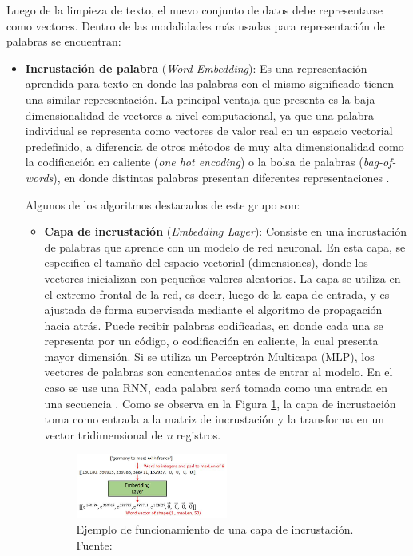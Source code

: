 Luego de la limpieza de texto, el nuevo conjunto de datos debe representarse como vectores. Dentro de las modalidades más usadas para representación de palabras se encuentran:
\begin{itemize}
	\item \textbf{Incrustación de palabra} (\textit{Word Embedding}): Es una representación aprendida para texto en donde las palabras con el mismo significado tienen una similar representación. La principal ventaja que presenta es la baja dimensionalidad de vectores a nivel computacional, ya que una palabra individual se representa como vectores de valor real en un espacio vectorial predefinido, a diferencia de otros métodos de muy alta dimensionalidad como la codificación en caliente (\textit{one hot encoding}) o la bolsa de palabras (\textit{bag-of-words}), en donde distintas palabras presentan diferentes representaciones \parencite{bk_brownlee2017deeplearning_nlp}.
	
	Algunos de los algoritmos destacados de este grupo son:
	\begin{itemize}
		\item \textbf{Capa de incrustación} (\textit{Embedding Layer}): Consiste en una incrustación de palabras que aprende con un modelo de red neuronal. En esta capa, se especifica el tamaño del espacio vectorial (dimensiones), donde los vectores inicializan con pequeños valores aleatorios. La capa se utiliza en el extremo frontal de la red, es decir, luego de la capa de entrada, y es ajustada de forma supervisada mediante el algoritmo de propagación hacia atrás. Puede recibir palabras codificadas, en donde cada una se representa por un código, o codificación en caliente, la cual presenta mayor dimensión. Si se utiliza un Perceptrón Multicapa (MLP), los vectores de palabras son concatenados antes de entrar al modelo. En el caso se use una RNN, cada palabra será tomada como una entrada en una secuencia \parencite{bk_brownlee2017deeplearning_nlp}. Como se observa en la Figura \ref{2:fig47}, la capa de incrustación toma como entrada a la matriz de incrustación y la transforma en un vector tridimensional de \textit{n} registros.
		
		\begin{figure}[!ht]
			\begin{center}
				\includegraphics[width=0.50\textwidth]{2/figures/embedding_layer.jpg}
				\caption[Ejemplo de funcionamiento de una capa de incrustación]{Ejemplo de funcionamiento de una capa de incrustación. Fuente: \cite{tec_chengwei2018embedding}}
				\label{2:fig47}
			\end{center}
		\end{figure}
		

\end{itemize}
\end{itemize}
